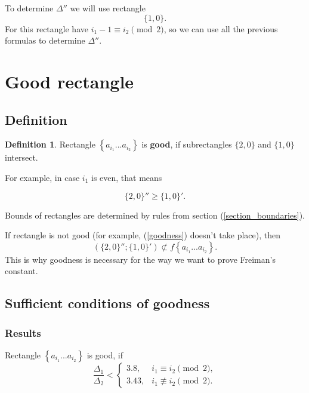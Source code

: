 \documentclass[a4paper, 12pt]{article}
\let\oldref\ref
\renewcommand{\ref}[1]{(\oldref{#1})}
\theoremstyle{definition}
\newtheorem*{definition}{Definition}
\theoremstyle{definition}
\theoremstyle{proposition}
\theoremstyle{lemma}
\newcommand{\D}{\Delta}
\begin{document}
To determine $\D''$ we will use rectangle
$$\{1, 0\}.$$
For this rectangle have $i_1 - 1 \equiv i_2 \pmod 2$, so we can use all the previous formulas to determine $\D''$.

\section{Good rectangle}
\label{section_good}

\subsection{Definition}

\begin{definition}
	Rectangle $\left\{ a_{i_1} ... a_{i_2} \right\}$ is \textbf{good},
	if subrectangles
	$\{2, 0\}$ and $\{1, 0\}$ intersect.
\end{definition}

For example, in case $i_1$ is even, that means

\begin{equation}\tag{6.3}\label{goodness}
	\{2, 0\}'' \geqslant \{1, 0\}'.
\end{equation}

Bounds of rectangles are determined by rules from section \ref{section_boundaries}.

If rectangle is not good (for example, \ref{goodness} doesn't take place), then
$$ ( \{2, 0\}'' ; \{1, 0\}' ) \not\subset
f \left\{ a_{i_1} ... a_{i_2} \right\}. $$
This is why goodness is necessary for the way we want to prove Freiman's constant.

\subsection{Sufficient conditions of goodness}

\subsubsection{Results}

Rectangle $\left\{ a_{i_1} ... a_{i_2} \right\}$ is good, if
\begin{equation}\label{goodness_condition}
	\dfrac{\D_1}{\D_2} <
	\left\{\begin{array}{ll}
		3.8, & i_1 \equiv i_2 \pmod 2,\\
		3.43, & i_1 \not\equiv i_2 \pmod 2.
	\end{array}\right.
\end{equation}
\end{document}
